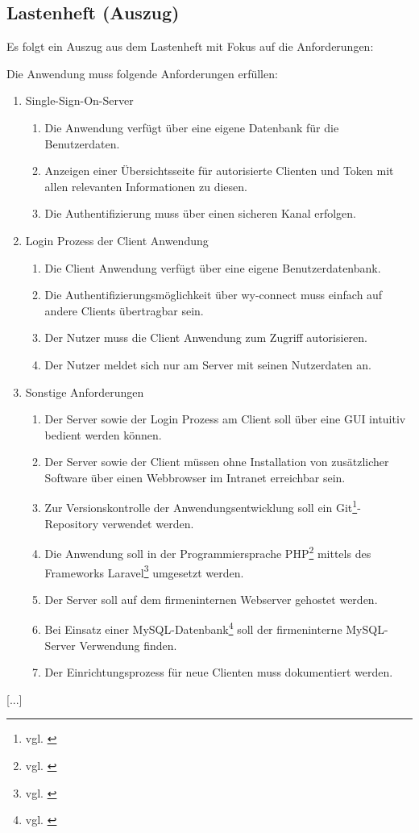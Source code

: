 \newpage
\subsection{Lastenheft (Auszug)}
\label{app:Lastenheft}
Es folgt ein Auszug aus dem Lastenheft mit Fokus auf die Anforderungen:

Die Anwendung muss folgende Anforderungen erfüllen: 
\begin{enumerate}[itemsep=0em,partopsep=0em,parsep=0em,topsep=0em]
\item Single-Sign-On-Server
	\begin{enumerate}
	\item Die Anwendung verfügt über eine eigene Datenbank für die Benutzerdaten.
	\item Anzeigen einer Übersichtsseite für autorisierte Clienten und Token mit allen relevanten Informationen zu diesen.
	\item Die Authentifizierung muss über einen sicheren Kanal erfolgen.
	\end{enumerate}
\item Login Prozess der Client Anwendung
	\begin{enumerate}
	\item Die Client Anwendung verfügt über eine eigene Benutzerdatenbank.
	\item Die Authentifizierungsmöglichkeit über wy-connect muss einfach auf andere Clients übertragbar sein.
	\item Der Nutzer muss die Client Anwendung zum Zugriff autorisieren.
	\item Der Nutzer meldet sich nur am Server mit seinen Nutzerdaten an.
	\end{enumerate}
\item Sonstige Anforderungen
	\begin{enumerate}
	\item Der Server sowie der Login Prozess am Client soll über eine \acs{GUI} intuitiv bedient werden können.
	\item Der Server sowie der Client müssen ohne Installation von zusätzlicher Software über einen
Webbrowser im Intranet erreichbar sein. 
	\item Zur Versionskontrolle der Anwendungsentwicklung soll ein Git\footnote{vgl. \cite{Git}}-Repository
verwendet werden.
	\item Die Anwendung soll in der Programmiersprache \acs{PHP}\footnote{vgl. \cite{PHP}} mittels des Frameworks Laravel\footnote{vgl. \cite{Laravel}} umgesetzt werden.	
	\item Der Server soll auf dem firmeninternen Webserver gehostet
werden.
	\item Bei Einsatz einer MySQL-Datenbank\footnote{vgl. \cite{MySQL}} soll der firmeninterne MySQL-Server Verwendung
finden.
	\item Der Einrichtungsprozess für neue Clienten muss dokumentiert werden.
	\end{enumerate}
\end{enumerate}
		{[...]}


